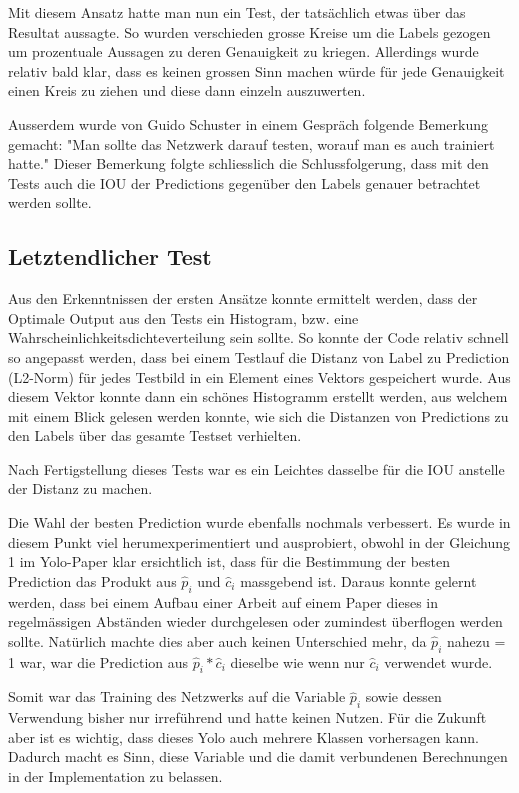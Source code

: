 Mit diesem Ansatz hatte man nun ein Test, der tatsächlich etwas über das Resultat aussagte. 
So wurden verschieden grosse Kreise um die Labels gezogen um prozentuale Aussagen zu deren Genauigkeit zu kriegen.
Allerdings wurde relativ bald klar, dass es keinen grossen Sinn machen würde für jede Genauigkeit einen Kreis zu ziehen und diese dann einzeln auszuwerten.

Ausserdem wurde von Guido Schuster \cite{PrivateCommunication} in einem Gespräch folgende Bemerkung gemacht:
"Man sollte das Netzwerk darauf testen, worauf man es auch trainiert hatte."
Dieser Bemerkung folgte schliesslich die Schlussfolgerung, dass mit den Tests auch die IOU der Predictions gegenüber den Labels genauer betrachtet werden sollte.

\subsection{Letztendlicher Test}
\label{chapter:letztendlicher_test}
Aus den Erkenntnissen der ersten Ansätze konnte ermittelt werden, dass der Optimale Output aus den Tests ein Histogram, bzw. eine Wahrscheinlichkeitsdichteverteilung sein sollte.
So konnte der Code relativ schnell so angepasst werden, dass bei einem Testlauf die Distanz von Label zu Prediction (L2-Norm) für jedes Testbild in ein Element eines Vektors gespeichert wurde.
Aus diesem Vektor konnte dann ein schönes Histogramm erstellt werden, aus welchem mit einem Blick gelesen werden konnte, wie sich die Distanzen von Predictions zu den Labels über das gesamte Testset verhielten.

Nach Fertigstellung dieses Tests war es ein Leichtes dasselbe für die IOU anstelle der Distanz zu machen. 

Die Wahl der besten Prediction wurde ebenfalls nochmals verbessert.
Es wurde in diesem Punkt viel herumexperimentiert und ausprobiert, obwohl in der Gleichung 1 im Yolo-Paper \cite{yolo} klar ersichtlich ist, dass für die Bestimmung der besten Prediction das Produkt aus $\hat{p}_i$ und $\hat{c}_i$ massgebend ist.
Daraus konnte gelernt werden, dass bei einem Aufbau einer Arbeit auf einem Paper dieses in regelmässigen Abständen wieder durchgelesen oder zumindest überflogen werden sollte.
Natürlich machte dies aber auch keinen Unterschied mehr, da $\hat{p}_i$ nahezu = 1 war, war die Prediction aus $\hat{p}_i * \hat{c}_i$ dieselbe wie wenn nur $\hat{c}_i$ verwendet wurde.

Somit war das Training des Netzwerks auf die Variable $\hat{p}_i$ sowie dessen Verwendung bisher nur irreführend und hatte keinen Nutzen.
Für die Zukunft aber ist es wichtig, dass dieses Yolo auch mehrere Klassen vorhersagen kann.
Dadurch macht es Sinn, diese Variable und die damit verbundenen Berechnungen in der Implementation zu belassen. 

